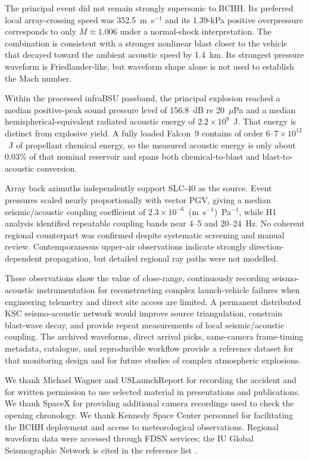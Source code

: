 \documentclass[]{seismica}
\begin{document}
The principal event did not remain strongly supersonic to BCHH. Its preferred
local array-crossing speed was 352.5~m~s$^{-1}$ and its 1.39-kPa positive
overpressure corresponds to only $M\approx1.006$ under a normal-shock
interpretation. The combination is consistent with a stronger nonlinear blast
closer to the vehicle that decayed toward the ambient acoustic speed by
1.4~km. Its strongest pressure waveform is Friedlander-like, but waveform
shape alone is not used to establish the Mach number.

Within the processed infraBSU passband, the principal explosion reached a
median positive-peak sound pressure level of 156.8~dB re 20~$\mu$Pa and a
median hemispherical-equivalent radiated acoustic energy of
$2.2\times10^9$~J. That energy is distinct from explosive yield. A fully loaded
Falcon~9 contains of order $6$--$7\times10^{12}$~J of propellant chemical
energy, so the measured acoustic energy is only about 0.03\% of that nominal
reservoir and spans both chemical-to-blast and blast-to-acoustic conversion.

Array back azimuths independently support SLC-40 as the source. Event
pressures scaled nearly proportionally with vector PGV, giving a median
seismic/acoustic coupling coefficient of
$2.3\times10^{-6}$~(m~s$^{-1}$)~Pa$^{-1}$, while H1 analysis identified
repeatable coupling bands near 4--5 and 20--24~Hz. No coherent regional
counterpart was confirmed despite systematic screening and manual review.
Contemporaneous upper-air observations indicate strongly direction-dependent
propagation, but detailed regional ray paths were not modelled.

These observations show the value of close-range, continuously recording
seismo-acoustic instrumentation for reconstructing complex launch-vehicle
failures when engineering telemetry and direct site access are limited. A
permanent distributed KSC seismo-acoustic network would improve source
triangulation, constrain blast-wave decay, and provide repeat measurements of
local seismic/acoustic coupling. The archived waveforms, direct arrival picks,
same-camera frame-timing metadata, catalogue, and reproducible workflow provide
a reference dataset for that monitoring design and for future studies of
complex atmospheric explosions.

\begin{acknowledgements}
We thank Michael Wagner and USLaunchReport for recording the accident and for
written permission to use selected material in presentations and publications.
We thank SpaceX for providing additional camera recordings used to check the
opening chronology.
We thank Kennedy Space Center personnel for facilitating the BCHH deployment
and access to meteorological observations. Regional waveform data were
accessed through FDSN services; the IU Global Seismographic Network is cited
in the reference list \citep{asl_gsn_iu_1988}.
\end{acknowledgements}
\end{document}
